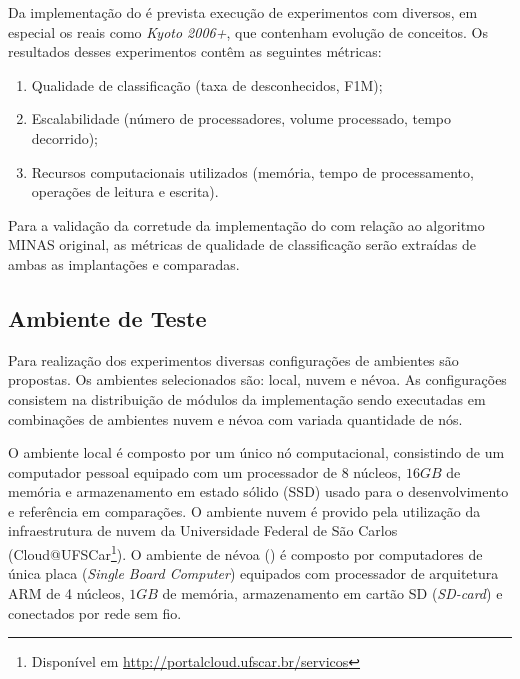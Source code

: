 
Da implementação do \mfog é prevista execução de experimentos com \datasets
diversos, em especial os \datasets reais como \emph{Kyoto 2006+},
que contenham evolução de conceitos.
Os resultados desses experimentos contêm as seguintes métricas:

\begin{enumerate}[label={\alph*)}]
  \item Qualidade de classificação (taxa de desconhecidos, F1M);
  \item Escalabilidade (número de processadores, volume processado, tempo
  decorrido);
  \item Recursos computacionais utilizados (memória, tempo de processamento,
  operações de leitura e escrita).
\end{enumerate}

Para a validação da corretude da implementação do \mfog com relação ao algoritmo
MINAS original, as métricas de qualidade de classificação serão extraídas de
ambas as implantações e comparadas.


\subsection{Ambiente de Teste}

Para realização dos experimentos diversas configurações de ambientes são
propostas.
Os ambientes selecionados são: local, nuvem e névoa.
As configurações consistem na distribuição de módulos da implementação \mfog
sendo executadas em combinações de ambientes nuvem e névoa com variada
quantidade de nós.

O ambiente local é composto por um único nó computacional, consistindo de um
computador pessoal equipado com um processador de 8 núcleos, $16GB$ de memória e
armazenamento em estado sólido (SSD) usado para o desenvolvimento e referência
em comparações.
O ambiente nuvem é provido pela utilização da infraestrutura de nuvem da
Universidade Federal de São Carlos (Cloud@UFSCar\footnote{Disponível em
\url{http://portalcloud.ufscar.br/servicos}}).
O ambiente de névoa (\fog) é composto por computadores de única placa
(\emph{Single Board Computer}) equipados com processador de arquitetura ARM de 4
núcleos, $1GB$ de memória, armazenamento em cartão SD (\emph{SD-card}) e
conectados por rede sem fio.

